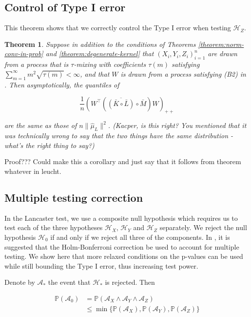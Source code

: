 \documentclass[]{article}
\newtheorem{theorem}{Theorem}
\begin{document}
\subsection{Control of Type I error}

This theorem shows that we correctly control the Type I error when testing $\mathcal{H}_Z$.

\begin{theorem}
Suppose in addition to the conditions of Theorems \ref{theorem:norm-conv-in-prob} and \ref{theorem:degenerate-kernel} that  $(X_i,Y_i,Z_i)_{i=1}^n$ are drawn from a process that is $\tau$-mixing with coefficients $\tau(m)$ satisfying $\sum_{m=1}^\infty m^2 \sqrt{\tau(m)} < \infty$, and that $W$ is drawn from a process satisfying (B2) in \cite{leucht2013dependent}. Then asymptotically, the quantiles of

\[\frac{1}{n}\left(W^\intercal\left( \overline{\left( \bar{K} \circ \bar{L}\right) }\circ \bar{M} \right)W\right) _{++}\]

are the same as those of $ n\| \hat \mu_L\|^2$. (Kacper, is this right? You mentioned that it was technically wrong to say that the two things have the same distribution - what's the right thing to say?)
\end{theorem}

Proof??? Could make this a corollary and just say that it follows from theorem whatever in leucht.


\subsection{Multiple testing correction}
In the Lancaster test, we use a composite null hypothesis which requires us to test each of the three hypotheses $\mathcal{H}_X$, $\mathcal{H}_Y$ and $\mathcal{H}_Z$ separately. We reject the null hypothesis $\mathcal{H}_0$ if and only if we reject all three of the components. In \cite{sejdinovic2013kernel}, it is suggested that the Holm-Bonferroni \cite{holm1979simple} correction be used to account for multiple testing. We show here that more relaxed conditions on the p-values can be used while still bounding the Type I error, thus increasing test power.

Denote by $\mathcal{A}_*$ the event that $\mathcal{H}_*$ is rejected. Then

\begin{align*}
\mathbb{P}(\mathcal{A}_0) &= \mathbb{P}(\mathcal{A}_X \land \mathcal{A}_Y \land \mathcal{A}_Z) \\
&\leq \min\{\mathbb{P}(\mathcal{A}_X), \mathbb{P}(\mathcal{A}_Y), \mathbb{P}(\mathcal{A}_Z)\}
\end{align*}
\end{document}
